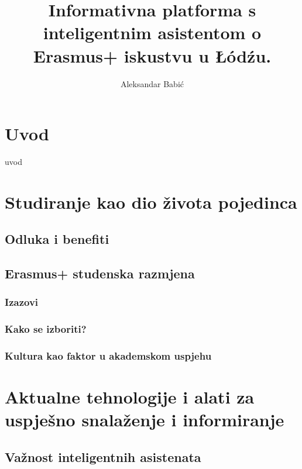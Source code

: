 \documentclass[]{foi}
\title{Informativna platforma s inteligentnim asistentom o Erasmus+ iskustvu u \L\'{o}d\'{z}u.}
\author{Aleksandar Babić}
\begin{document}
\maketitle

\tableofcontents

\makeatletter {} \makeatother
\pagestyle{plain}



\chapter{Uvod}

uvod



\chapter{Studiranje kao dio života pojedinca}

\section{Odluka i benefiti}
\section{Erasmus+ studenska razmjena}
\subsection{Izazovi}
\subsection{Kako se izboriti?}
\subsection{Kultura kao faktor u akademskom uspjehu}



\chapter{Aktualne tehnologije i alati za uspješno snalaženje i informiranje}
\section{Važnost inteligentnih asistenata}
\end{document}
